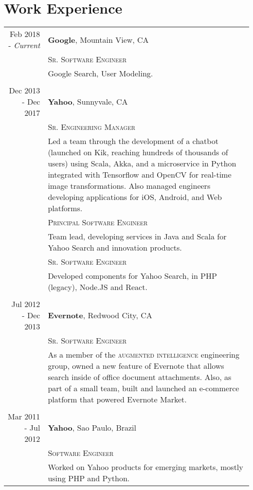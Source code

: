 \documentclass[a4paper,10pt]{article}
\begin{document}
\section{Work Experience}
\begin{tabular}{r|p{14cm}}
Feb 2018 - \emph{Current} & \textbf{Google}\footnotemark,
                                Mountain View, CA
\\ &\textsc{Sr. Software Engineer}\\&

Google Search, User Modeling.

 \\

 \multicolumn{2}{c}{} \\

Dec 2013 - Dec 2017 & \textbf{Yahoo}\footnotemark,
                                Sunnyvale, CA
\\ &\textsc{Sr. Engineering Manager}\\&

 Led a team through the development of a chatbot (launched on Kik, reaching
 hundreds of thousands of users) using Scala, Akka, and a microservice in Python
 integrated with Tensorflow and OpenCV for real-time image transformations.
 Also managed engineers developing applications for iOS, Android, and Web
 platforms.

 \\
 &\textsc{Principal Software Engineer}\\&

 Team lead, developing services in Java and Scala for Yahoo Search
 and innovation products.

 \\
 &\textsc{Sr. Software Engineer}\\&

 Developed components for Yahoo Search, in PHP (legacy), Node.JS and React.

 \\

 \multicolumn{2}{c}{} \\

 Jul 2012 - Dec 2013 & \textbf{Evernote}, Redwood City, CA \\
 &\textsc{Sr. Software Engineer}\\&

 As a member of the \textsc{augmented intelligence} engineering group, owned
 a new feature of Evernote that allows search
 inside of office document attachments. Also, as part of a small team,
 built and launched an e-commerce platform that powered Evernote Market.

 \\
 \multicolumn{2}{c}{} \\

 Mar 2011 - Jul 2012 & \textbf{Yahoo}\footnotemark[1], Sao Paulo, Brazil \\
 &\textsc{Software Engineer}\\&

 Worked on Yahoo products for emerging markets, mostly using PHP and Python.

\end{tabular}
\end{document}
